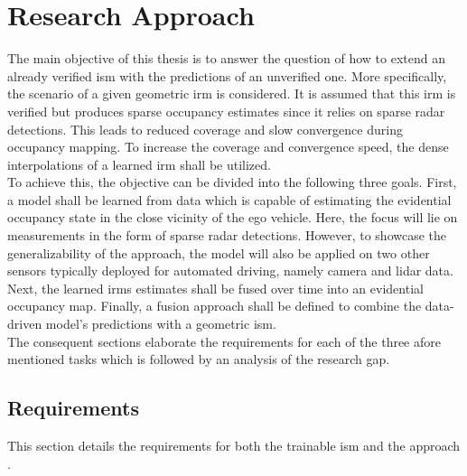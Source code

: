 \chapter{Research Approach}
\label{ch:research_approach}
The main objective of this thesis is to answer the question of how to extend an already verified \gls{ism} with the predictions of an unverified one. More specifically, the scenario of a given geometric \gls{irm} is considered. It is assumed that this \gls{irm} is verified but produces sparse occupancy estimates since it relies on sparse radar detections. This leads to reduced coverage and slow convergence during occupancy mapping. To increase the coverage and convergence speed, the dense interpolations of a learned \gls{irm} shall be utilized.\\ 
To achieve this, the objective can be divided into the following three goals. First, a model shall be learned from data which is capable of estimating the evidential occupancy state in the close vicinity of the ego vehicle. Here, the focus will lie on measurements in the form of sparse radar detections. However, to showcase the generalizability of the approach, the model will also be applied on two other sensors typically deployed for automated driving, namely camera and lidar data. Next, the learned \gls{irm}s estimates shall be fused over time into an evidential occupancy map. Finally, a fusion approach shall be defined to combine the data-driven model's predictions with a geometric \gls{ism}.\\
The consequent sections elaborate the requirements for each of the three afore mentioned tasks which is followed by an analysis of the research gap. 
%
\section{Requirements}
\label{sec:requirements}
This section details the requirements for both the trainable \gls{ism} and the approach .

%
